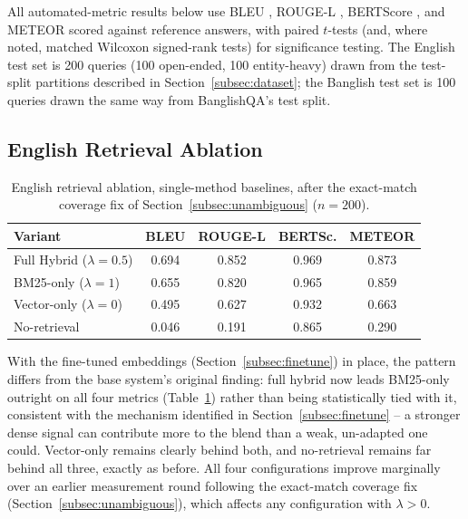\documentclass[a4paper,twoside]{article}
\begin{document}
All automated-metric results below use BLEU \citep{papineni2002}, ROUGE-L \citep{lin2004}, BERTScore \citep{zhang2019}, and METEOR \citep{banerjee2005} scored against reference answers, with paired $t$-tests (and, where noted, matched Wilcoxon signed-rank tests) for significance testing. The English test set is 200 queries (100 open-ended, 100 entity-heavy) drawn from the test-split partitions described in Section~\ref{subsec:dataset}; the Banglish test set is 100 queries drawn the same way from BanglishQA's test split.

\subsection{English Retrieval Ablation}
\label{subsec:ablation}

\begin{table}[t]
\caption{English retrieval ablation, single-method baselines, after the exact-match coverage fix of Section~\ref{subsec:unambiguous} ($n=200$).}\label{tab:ablation} \centering
\begin{tabular}{|l|c|c|c|c|}
\hline
Variant & BLEU & ROUGE-L & BERTSc. & METEOR \\
\hline
Full Hybrid ($\lambda=0.5$) & 0.694 & 0.852 & 0.969 & 0.873 \\
BM25-only ($\lambda=1$) & 0.655 & 0.820 & 0.965 & 0.859 \\
Vector-only ($\lambda=0$) & 0.495 & 0.627 & 0.932 & 0.663 \\
No-retrieval & 0.046 & 0.191 & 0.865 & 0.290 \\
\hline
\end{tabular}
\end{table}

With the fine-tuned embeddings (Section~\ref{subsec:finetune}) in place, the pattern differs from the base system's original finding: full hybrid now leads BM25-only outright on all four metrics (Table~\ref{tab:ablation}) rather than being statistically tied with it, consistent with the mechanism identified in Section~\ref{subsec:finetune} -- a stronger dense signal can contribute more to the blend than a weak, un-adapted one could. Vector-only remains clearly behind both, and no-retrieval remains far behind all three, exactly as before. All four configurations improve marginally over an earlier measurement round following the exact-match coverage fix (Section~\ref{subsec:unambiguous}), which affects any configuration with $\lambda>0$.
\end{document}

